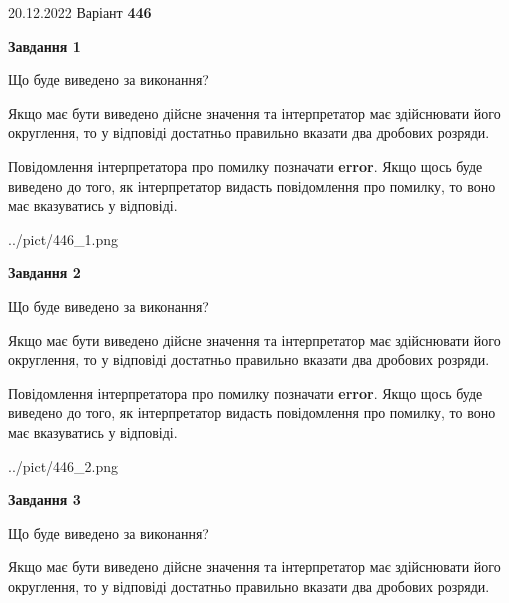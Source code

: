 \documentclass[12pt, ukrainian]{article}
\begin{document}
{20.12.2022 Варіант \No \textbf { 446 }\par}
{
\begin {Large}

{\begin {center}\textbf{Завдання 1}\end {center}}\par
Що буде виведено за виконання? \par

Якщо має бути виведено дійсне значення та інтерпретатор має здійснювати його округлення, 
то у відповіді достатньо правильно вказати два дробових розряди.

Повідомлення інтерпретатора про помилку позначати \textbf{error}.
Якщо щось буде виведено до того, як інтерпретатор видасть повідомлення про помилку, 
то воно має вказуватись у відповіді. \par

\begin{center}
	{../pict/446_1.png}
\end{center}
\newpage

{\begin {center}\textbf{Завдання 2}\end {center}}\par
Що буде виведено за виконання? \par

Якщо має бути виведено дійсне значення та інтерпретатор має здійснювати його округлення, 
то у відповіді достатньо правильно вказати два дробових розряди.

Повідомлення інтерпретатора про помилку позначати \textbf{error}.
Якщо щось буде виведено до того, як інтерпретатор видасть повідомлення про помилку, 
то воно має вказуватись у відповіді. \par

\begin{center}
	{../pict/446_2.png}
\end{center}
\newpage

{\begin {center}\textbf{Завдання 3}\end {center}}\par
Що буде виведено за виконання? \par

Якщо має бути виведено дійсне значення та інтерпретатор має здійснювати його округлення, 
то у відповіді достатньо правильно вказати два дробових розряди.


\end{Large}}
\end{document}
